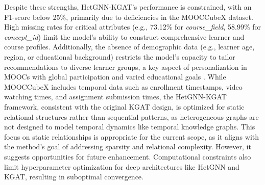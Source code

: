 \documentclass{ieeeaccess}
\begin{document}
Despite these strengths, HetGNN-KGAT’s performance is constrained, with an F1-score below 25\%, primarily due to deficiencies in the MOOCCubeX dataset. High missing rates for critical attributes (e.g., 73.12\% for \textit{course\_field}, 58.99\% for \textit{concept\_id}) limit the model’s ability to construct comprehensive learner and course profiles. Additionally, the absence of demographic data (e.g., learner age, region, or educational background) restricts the model’s capacity to tailor recommendations to diverse learner groups, a key aspect of personalization in MOOCs with global participation and varied educational goals \cite{jordan2014initial_trend_mooc}. While MOOCCubeX includes temporal data such as enrollment timestamps, video watching times, and assignment submission times, the HetGNN-KGAT framework, consistent with the original KGAT design, is optimized for static relational structures rather than sequential patterns, as heterogeneous graphs are not designed to model temporal dynamics like temporal knowledge graphs. This focus on static relationships is appropriate for the current scope, as it aligns with the method’s goal of addressing sparsity and relational complexity. However, it suggests opportunities for future enhancement. Computational constraints also limit hyperparameter optimization for deep architectures like HetGNN and KGAT, resulting in suboptimal convergence.
\end{document}
